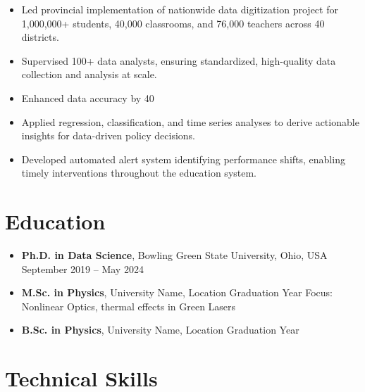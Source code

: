 \documentclass[a4paper,10pt]{article}
\begin{document}
\begin{itemize}
    \item Led provincial implementation of nationwide data digitization project for 1,000,000+ students, 40,000 classrooms, and 76,000 teachers across 40 districts.
   
    \item Supervised 100+ data analysts, ensuring standardized, high-quality data collection and analysis at scale.
    
    \item Enhanced data accuracy by 40%
    
    \item Applied regression, classification, and time series analyses to derive actionable insights for data-driven policy decisions.
    
    \item Developed automated alert system identifying performance shifts, enabling timely interventions throughout the education system.
\end{itemize}

\section*{Education}

\begin{itemize}
    \item {\bfseries Ph.D. in Data Science}, Bowling Green State University, Ohio, USA \hfill September 2019 -- May 2024
    
    \item {\bfseries M.Sc. in Physics}, University Name, Location \hfill Graduation Year
    Focus: Nonlinear Optics, thermal effects in Green Lasers
    
    \item {\bfseries B.Sc. in Physics}, University Name, Location \hfill Graduation Year
\end{itemize}

\section*{Technical Skills}
\end{document}
